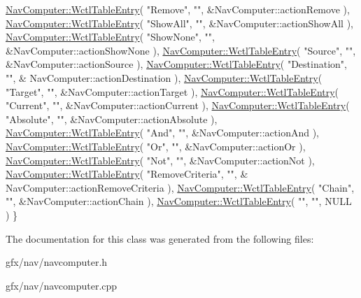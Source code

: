 \begin{DoxyCode}
    \hyperlink{structNavComputer_1_1WctlTableEntry}{NavComputer::WctlTableEntry}( \textcolor{stringliteral}{"Remove"}, \textcolor{stringliteral}{""}, &NavComputer::actionRemove ),
    \hyperlink{structNavComputer_1_1WctlTableEntry}{NavComputer::WctlTableEntry}( \textcolor{stringliteral}{"ShowAll"}, \textcolor{stringliteral}{""}, &NavComputer::actionShowAll ),
    \hyperlink{structNavComputer_1_1WctlTableEntry}{NavComputer::WctlTableEntry}( \textcolor{stringliteral}{"ShowNone"}, \textcolor{stringliteral}{""}, &NavComputer::actionShowNone ),
    \hyperlink{structNavComputer_1_1WctlTableEntry}{NavComputer::WctlTableEntry}( \textcolor{stringliteral}{"Source"}, \textcolor{stringliteral}{""}, &NavComputer::actionSource ),
    \hyperlink{structNavComputer_1_1WctlTableEntry}{NavComputer::WctlTableEntry}( \textcolor{stringliteral}{"Destination"}, \textcolor{stringliteral}{""}, &
      NavComputer::actionDestination ),
    \hyperlink{structNavComputer_1_1WctlTableEntry}{NavComputer::WctlTableEntry}( \textcolor{stringliteral}{"Target"}, \textcolor{stringliteral}{""}, &NavComputer::actionTarget ),
    \hyperlink{structNavComputer_1_1WctlTableEntry}{NavComputer::WctlTableEntry}( \textcolor{stringliteral}{"Current"}, \textcolor{stringliteral}{""}, &NavComputer::actionCurrent ),
    \hyperlink{structNavComputer_1_1WctlTableEntry}{NavComputer::WctlTableEntry}( \textcolor{stringliteral}{"Absolute"}, \textcolor{stringliteral}{""}, &NavComputer::actionAbsolute ),
    \hyperlink{structNavComputer_1_1WctlTableEntry}{NavComputer::WctlTableEntry}( \textcolor{stringliteral}{"And"}, \textcolor{stringliteral}{""}, &NavComputer::actionAnd ),
    \hyperlink{structNavComputer_1_1WctlTableEntry}{NavComputer::WctlTableEntry}( \textcolor{stringliteral}{"Or"}, \textcolor{stringliteral}{""}, &NavComputer::actionOr ),
    \hyperlink{structNavComputer_1_1WctlTableEntry}{NavComputer::WctlTableEntry}( \textcolor{stringliteral}{"Not"}, \textcolor{stringliteral}{""}, &NavComputer::actionNot ),
    \hyperlink{structNavComputer_1_1WctlTableEntry}{NavComputer::WctlTableEntry}( \textcolor{stringliteral}{"RemoveCriteria"}, \textcolor{stringliteral}{""}, &
      NavComputer::actionRemoveCriteria ),
    \hyperlink{structNavComputer_1_1WctlTableEntry}{NavComputer::WctlTableEntry}( \textcolor{stringliteral}{"Chain"}, \textcolor{stringliteral}{""}, &NavComputer::actionChain ),
    \hyperlink{structNavComputer_1_1WctlTableEntry}{NavComputer::WctlTableEntry}( \textcolor{stringliteral}{""}, \textcolor{stringliteral}{""}, NULL )
\}
\end{DoxyCode}


The documentation for this class was generated from the following files\+:\begin{DoxyCompactItemize}
\item 
gfx/nav/navcomputer.\+h\item 
gfx/nav/navcomputer.\+cpp\end{DoxyCompactItemize}
